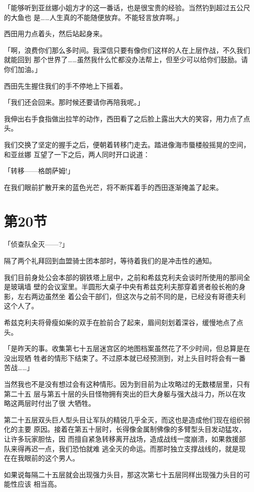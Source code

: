 \documentclass[11pt]{book}
\begin{document}
「能够听到亚丝娜小姐方才的这一番话，也是很宝贵的经验。当然钓到超过五公尺的大鱼也
是……人生真的不能随便放弃。不能轻言放弃啊。」

西田用力点着头，然后站起身来。

「啊，浪费你们那么多时间。我深信只要有像你们这样的人在上层作战，不久我们就能回到
那个世界了……虽然我什么忙都没办法帮上，但至少可以给你们鼓励。请你们加油。」

西田先生握住我们的手不停地上下摇着。

「我们还会回来。那时候还要请你再陪我呢。」

我伸出右手食指做出拉竿的动作，西田看了之后脸上露出大大的笑容，用力点了点头。

我们交换了坚定的握手之后，便朝着转移门走去。踏进像海市蜃楼般摇晃的空间，和亚丝娜
互望了一下之后，两人同时开口说道：

「转移——格朗萨姆!」

在我们眼前扩散开来的蓝色光芒，将不断挥着手的西田逐渐掩盖了起来。
\section{第20节}
\label{sec:orgb2ca5a7}
「侦查队全灭——?」

隔了两个礼拜回到血盟骑士团本部时，等待着我们的是冲击性的通知。

我们目前身处公会本部的钢铁塔上层中，之前和希兹克利夫会谈时所使用的那间全是玻璃墙
壁的会议室里。半圆形大桌子中央有希兹克利夫那穿着贤者般长袍的身影，左右两边虽然坐
着公会干部们，但这次与之前不同的是，已经没有哥德夫利这个人了。

希兹克利夫将骨瘦如柴的双手在脸前合了起来，眉间刻划着深谷，缓慢地点了点头。

「是昨天的事。收集第七十五层迷宫区的地图档案虽然花了不少时间，但总算是在没出现牺
牲者的情形下结束了。不过原本就已经预测到，对上头目时将会有一番苦战……」

当然我也不是没有想过会有这种情形。因为到目前为止攻略过的无数楼层里，只有第二十五
层与第五十层的头目怪物拥有突出的巨大身躯与强大战斗力，所以在攻略这两层时付出了很
大牺牲。

第二十五层双头巨人型头目让军队的精锐几乎全灭，而这也是造成他们现在组织弱化的主要
原因。接着在第五十层时，长得像金属制佛像的多臂型头目发动猛攻，让许多玩家胆怯，因
而擅自紧急转移离开战场，造成战线一度崩溃，如果救援部队来得再迟一点，我们恐怕就难
逃全灭的命运。而那时独立支撑战线的，就是现在在我眼前的这个男人。

如果说每隔二十五层就会出现强力头目，那这次第七十五层同样出现强力头目的可能性应该
相当高。
\end{document}
